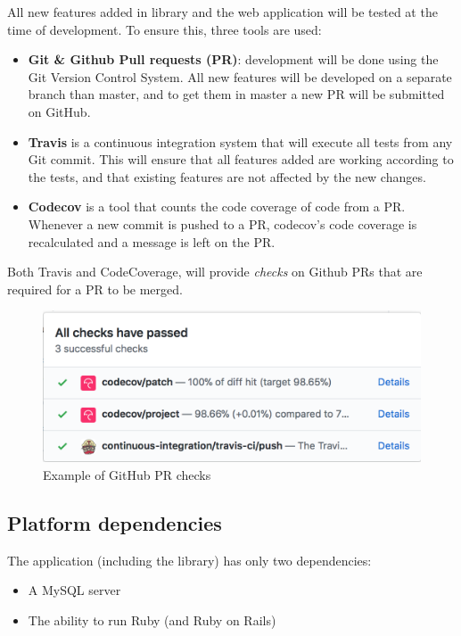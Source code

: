 All new features added in library and the web application will be tested at the time of development. To ensure this, three tools are used:
\begin{itemize}
  \item \textbf{Git \& Github Pull requests (PR)}: development will be done using the Git Version Control System. All new features will be developed on a separate branch than master, and to get them in master a new PR will be submitted on GitHub.
  \item \textbf{Travis} is a continuous integration system that will execute all tests from any Git commit. This will ensure that all features added are working according to the tests, and that existing features are not affected by the new changes.
  \item \textbf{Codecov} is a tool that counts the code coverage of code from a PR. Whenever a new commit is pushed to a PR, codecov's code coverage is recalculated and a message is left on the PR.
\end{itemize}
Both Travis and CodeCoverage, will provide \textit{checks} on Github PRs that are required for a PR to be merged.

\begin{figure}[h]
    \centering
    \includegraphics[width=(\linewidth / 3 * 2)]{Chapters/3-RequirementAndSpecifications/github_checks.png}
    \caption{Example of GitHub PR checks}
    \label{fig:create_assignment}
\end{figure}

\subsection{Platform dependencies}

The application (including the library) has only two dependencies:
\begin{itemize}
    \item A MySQL server
    \item The ability to run Ruby (and Ruby on Rails)
\end{itemize}


